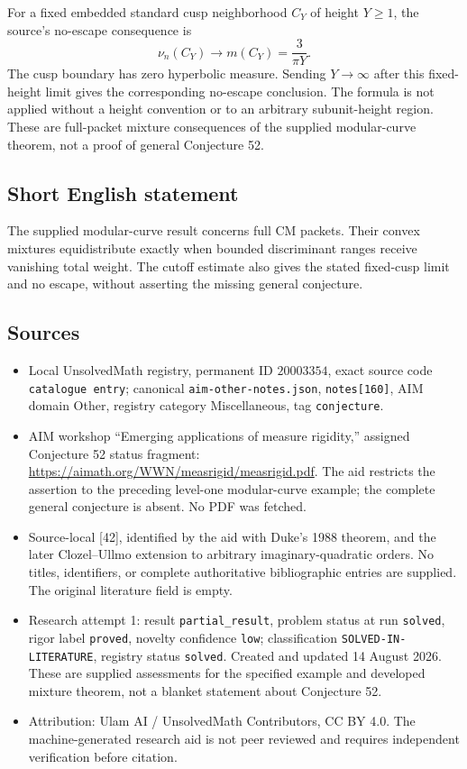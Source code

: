 \documentclass[11pt]{article}
\begin{document}
For a fixed embedded standard cusp neighborhood \(C_Y\) of height \(Y\geq1\), the source's no-escape consequence is
\[
 \nu_n(C_Y)\longrightarrow m(C_Y)=\frac3{\pi Y}.
\]
The cusp boundary has zero hyperbolic measure. Sending \(Y\to\infty\) after this fixed-height limit gives the corresponding no-escape conclusion. The formula is not applied without a height convention or to an arbitrary subunit-height region. These are full-packet mixture consequences of the supplied modular-curve theorem, not a proof of general Conjecture 52.
\subsection{Short English statement}
The supplied modular-curve result concerns full CM packets. Their convex mixtures equidistribute exactly when bounded discriminant ranges receive vanishing total weight. The cutoff estimate also gives the stated fixed-cusp limit and no escape, without asserting the missing general conjecture.
\subsection{Sources}
\begin{itemize}
\item Local UnsolvedMath registry, permanent ID \(20003354\), exact source code \texttt{catalogue entry}; canonical \texttt{aim-other-notes.json}, \texttt{notes[160]}, AIM domain Other, registry category Miscellaneous, tag \texttt{conjecture}.
\item AIM workshop ``Emerging applications of measure rigidity,'' assigned Conjecture 52 status fragment: \url{https://aimath.org/WWN/measrigid/measrigid.pdf}. The aid restricts the assertion to the preceding level-one modular-curve example; the complete general conjecture is absent. No PDF was fetched.
\item Source-local [42], identified by the aid with Duke's 1988 theorem, and the later Clozel--Ullmo extension to arbitrary imaginary-quadratic orders. No titles, identifiers, or complete authoritative bibliographic entries are supplied. The original literature field is empty.
\item Research attempt 1: result \texttt{partial\_result}, problem status at run \texttt{solved}, rigor label \texttt{proved}, novelty confidence \texttt{low}; classification \texttt{SOLVED-IN-LITERATURE}, registry status \texttt{solved}. Created and updated 14 August 2026. These are supplied assessments for the specified example and developed mixture theorem, not a blanket statement about Conjecture 52.
\item Attribution: Ulam AI / UnsolvedMath Contributors, CC BY 4.0. The machine-generated research aid is not peer reviewed and requires independent verification before citation.
\end{itemize}
\end{document}
